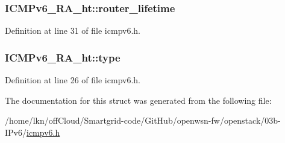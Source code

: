 \subsubsection[{\texorpdfstring{router\+\_\+lifetime}{router_lifetime}}]{ I\+C\+M\+Pv6\+\_\+\+R\+A\+\_\+ht\+::router\+\_\+lifetime}\hypertarget{struct_i_c_m_pv6___r_a__ht_a659272500ba7f102f26ed2485aa72adc}{}\label{struct_i_c_m_pv6___r_a__ht_a659272500ba7f102f26ed2485aa72adc}


Definition at line 31 of file icmpv6.\+h.

\subsubsection[{\texorpdfstring{type}{type}}]{ I\+C\+M\+Pv6\+\_\+\+R\+A\+\_\+ht\+::type}\hypertarget{struct_i_c_m_pv6___r_a__ht_a479c4667272b1ce11fd5692e4cb8af6d}{}\label{struct_i_c_m_pv6___r_a__ht_a479c4667272b1ce11fd5692e4cb8af6d}


Definition at line 26 of file icmpv6.\+h.



The documentation for this struct was generated from the following file\+:\begin{DoxyCompactItemize}
\item 
/home/lkn/off\+Cloud/\+Smartgrid-\/code/\+Git\+Hub/openwsn-\/fw/openstack/03b-\/\+I\+Pv6/\hyperlink{icmpv6_8h}{icmpv6.\+h}\end{DoxyCompactItemize}

